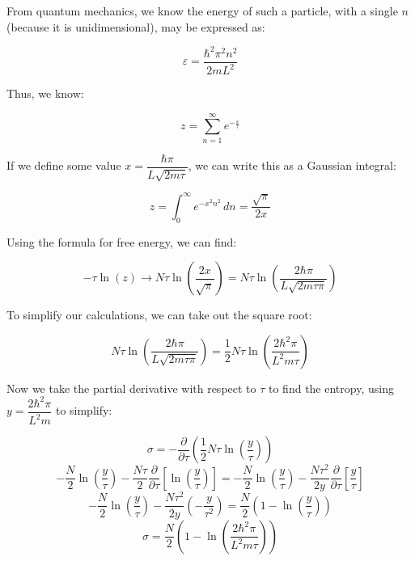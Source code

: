 \begin{enumerate}
    From quantum mechanics, we know the energy of such a particle, with a single $n$ (because it is unidimensional), may be expressed as:

    $$\varepsilon=\frac{\hbar^2\pi^2n^2}{2mL^2}$$

    Thus, we know:

    $$z=\sum_{n=1}^{\infty} e^{-\frac{\varepsilon}{\tau}}$$

    If we define some value $x=\dfrac{\hbar\pi}{L\sqrt{2m\tau}}$, we can write this as a Gaussian integral:

    $$z=\int_0^{\infty} e^{-x^2n^2}\,dn=\frac{\sqrt{\pi}}{2x}$$

    Using the formula for free energy, we can find:

    $$-\tau\ln\left(z\right)\rightarrow N\tau\ln\left(\frac{2x}{\sqrt{\pi}}\right)=N\tau\ln\left( \frac{2\hbar\pi}{L\sqrt{2m\tau\pi}}\right)$$
    
    To simplify our calculations, we can take out the square root:

    $$N\tau\ln\left( \frac{2\hbar\pi}{L\sqrt{2m\tau\pi}}\right)=\frac{1}{2}N\tau\ln\left( \frac{2\hbar^2\pi}{L^2m\tau}\right)$$

    Now we take the partial derivative with respect to $\tau$ to find the entropy, using $y=\dfrac{2\hbar^2\pi}{L^2m}$ to simplify:

    $$\sigma=-\frac{\partial}{\partial \tau}\left( \frac{1}{2}N\tau\ln\left( \frac{y}{\tau} \right) \right)$$
    $$-\frac{N}{2}\ln\left( \frac{y}{\tau} \right)-\frac{N\tau}{2}\frac{\partial}{\partial\tau}\left[\ln\left( \frac{y}{\tau} \right)\right]=-\frac{N}{2}\ln\left( \frac{y}{\tau} \right)-\frac{N\tau^2}{2y}\frac{\partial}{\partial\tau}\left[ \frac{y}{\tau} \right]$$
    $$-\frac{N}{2}\ln\left( \frac{y}{\tau} \right)-\frac{N\tau^2}{2y}\left(-\frac{y}{\tau^2}\right)=\frac{N}{2}\left( 1-\ln\left( \frac{y}{\tau} \right) \right)$$
    $$\boxed{\sigma=\frac{N}{2}\left( 1-\ln\left( \frac{2\hbar^2\pi}{L^2m\tau} \right) \right)}$$

\end{enumerate}



